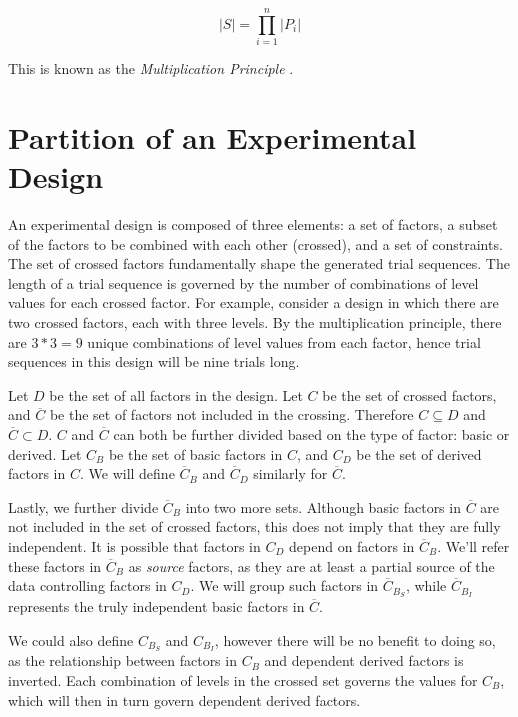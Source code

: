 \[
|S| = \prod_{i=1}^n |P_i|
\]

This is known as the \textit{Multiplication Principle} \cite{brualdi_introductory_2010}.



\section{Partition of an Experimental Design}

An experimental design is composed of three elements: a set of factors, a subset of the factors to be combined with each other (crossed), and a set of constraints. The set of crossed factors fundamentally shape the generated trial sequences. The length of a trial sequence is governed by the number of combinations of level values for each crossed factor. For example, consider a design in which there are two crossed factors, each with three levels. By the multiplication principle, there are $3 * 3 = 9$ unique combinations of level values from each factor, hence trial sequences in this design will be nine trials long.

Let $D$ be the set of all factors in the design. Let $C$ be the set of crossed factors, and $\overline{C}$ be the set of factors not included in the crossing. Therefore $C \subseteq D$ and $\overline{C} \subset D$. $C$ and $\overline{C}$ can both be further divided based on the type of factor: basic or derived. Let $C_B$ be the set of basic factors in $C$, and $C_D$ be the set of derived factors in $C$. We will define $\overline{C}_B$ and $\overline{C}_D$ similarly for $\overline{C}$.

Lastly, we further divide $\overline{C}_B$ into two more sets. Although basic factors in $\overline{C}$ are not included in the set of crossed factors, this does not imply that they are fully independent. It is possible that factors in $C_D$ depend on factors in $\overline{C}_B$. We'll refer these factors in $\overline{C}_B$ as \textit{source} factors, as they are at least a partial source of the data controlling factors in $C_D$. We will group such factors in $\overline{C}_{B_S}$, while $\overline{C}_{B_I}$ represents the truly independent basic factors in $\overline{C}$.

We could also define $C_{B_S}$ and $C_{B_I}$, however there will be no benefit to doing so, as the relationship between factors in $C_B$ and dependent derived factors is inverted. Each combination of levels in the crossed set governs the values for $C_B$, which will then in turn govern dependent derived factors.

